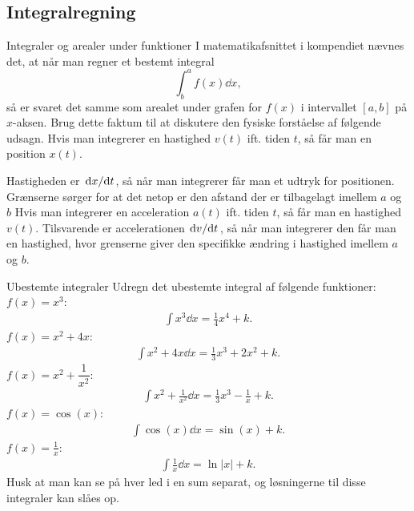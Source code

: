 \subsection*{Integralregning}
\begin{opgave}[1]{Integraler og arealer under funktioner}
I matematikafsnittet i kompendiet nævnes det, at når man regner et bestemt integral
\begin{equation*}
\int^a_b{f(x)}\dd{x},
\end{equation*}
så er svaret det samme som arealet under grafen for $f(x)$ i intervallet $[a,b]$ på $x$-aksen. Brug dette faktum til at diskutere den fysiske forståelse af følgende udsagn.
\opg Hvis man integrerer en hastighed $v(t)$ ift. tiden $t$, så får man en position $x(t)$.

Hastigheden er $\dv*{x}{t}$, så når man integrerer får man et udtryk for positionen. Grænserne sørger for at det netop er den afstand der er tilbagelagt imellem $a$ og $b$
\opg Hvis man integrerer en acceleration $a(t)$ ift. tiden $t$, så får man en hastighed $v(t)$. 
%
Tilsvarende er accelerationen $\dv*{v}{t}$, så når man integrerer den får man en hastighed, hvor grenserne giver den specifikke ændring i hastighed imellem $a$ og $b$.
\end{opgave}

\begin{opgave}[1]{Ubestemte integraler}
	Udregn det ubestemte integral af følgende funktioner:
	\opg $f(x) = x^3$:
    	\begin{align*}
    	    \int x^3\dd{x}=\frac{1}{4}x^4+k.
    	\end{align*}
	\opg $f(x) = x^2 + 4x$:
    	\begin{align*}
    	    \int x^2+4x\dd{x}=\frac{1}{3}x^3+2x^2+k.
    	\end{align*}
	\opg $f(x) = x^2 + \dfrac{1}{x^2}$:
	    \begin{align*}
	        \int x^2+\frac{1}{x^2}\dd{x}=\frac{1}{3}x^3-\frac{1}{x}+k.
	    \end{align*}
	\opg $f(x) = \cos (x)$:
	    \begin{align*}
	        \int \cos(x)\dd{x}=\sin(x)+k.
	    \end{align*}
	\opg $f(x) = \frac{1}{x}$:
	    \begin{align*}
	        \int\frac{1}{x}\dd{x}=\ln|x|+k.
	    \end{align*}
    Husk at man kan se på hver led i en sum separat, og løsningerne til disse integraler kan slåes op.
\end{opgave}

